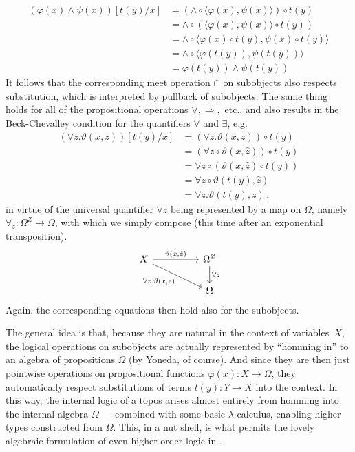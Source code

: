 \documentclass[12pt,reqno]{amsart}
\renewcommand{\to}{\ensuremath{\rightarrow}}
\theoremstyle{remark}
\theoremstyle{definition}
\begin{document}
\begin{align*}
(\varphi(x)\wedge\psi(x))[t(y)/x] &= (\wedge \circ \langle \varphi(x), \psi(x) \rangle) \circ t(y)\\
&= \wedge \circ (\langle \varphi(x), \psi(x) \rangle \circ t(y))\\
&= \wedge \circ \langle \varphi(x)\circ t(y), \psi(x)\circ t(y) \rangle\\
&=  \wedge \circ  \langle \varphi(t(y)), \psi(t(y))\rangle \\
&=  \varphi(t(y))\wedge\psi(t(y)) 
\end{align*}
It follows that the corresponding meet operation $\cap$ on subobjects also respects substitution, which is interpreted by pullback of subobjects.
The same thing holds for all of the propositional operations $\vee, \Rightarrow,$ etc., and also results in the Beck-Chevalley condition for the quantifiers $\forall$ and $\exists$, e.g.\
\begin{align*}
(\forall z .\vartheta(x,z))[t(y)/x] &= (\forall z .\vartheta(x,z))\circ t(y) \\
&= (\forall z \circ \vartheta(x,\hat{z}))\circ t(y)\\
&= \forall z \circ (\vartheta(x,\hat{z})\circ t(y))\\
&= \forall z \circ \vartheta(t(y),\hat{z})\\
&= \forall z .\vartheta(t(y),z)\,,
\end{align*}
in virtue of the universal quantifier $\forall z$ being represented by a map on $\Omega$, namely $\forall_z : \Omega^{Z} \to \Omega$, with which we simply compose (this time after an exponential transposition).
\begin{equation}\label{diag:BCforQ}
\begin{tikzcd}
 X \ar[rr, "{\vartheta(x,\hat{z})}" ] \ar[rrd,swap,  "{\forall z. \vartheta(x,z)}"] && \Omega^{Z} \ar[d, "{\forall z}"] \\
 && \Omega
\end{tikzcd}
\end{equation}
Again, the corresponding equations then hold also for the subobjects.

The general idea is that, because they are natural in the context of variables~$X$, the logical operations on subobjects are actually represented by ``homming in'' to an algebra of propositions $\Omega$ (by Yoneda, of course). And since they are then just pointwise operations on propositional functions $\varphi(x) : X \to \Omega$, they automatically respect substitutions of terms $t(y): Y \to X$  into the context.  In this way,  the internal logic of a topos arises almost entirely from homming into the internal algebra $\Omega$ --- combined with some basic $\lambda$-calculus, enabling higher types constructed from $\Omega$.  This, in a nut shell, is what permits the lovely algebraic formulation of even higher-order logic in \cite{LS:1988}.  
\end{document}

